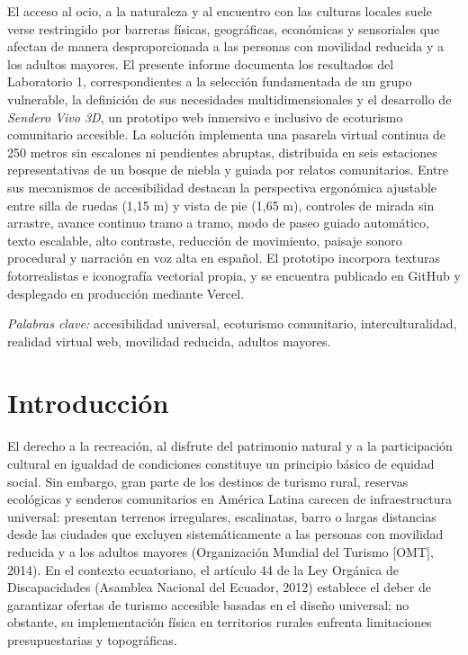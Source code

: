 \documentclass[12pt,letterpaper]{article}
\begin{document}
\noindent El acceso al ocio, a la naturaleza y al encuentro con las culturas locales suele verse restringido por barreras físicas, geográficas, económicas y sensoriales que afectan de manera desproporcionada a las personas con movilidad reducida y a los adultos mayores. El presente informe documenta los resultados del Laboratorio 1, correspondientes a la selección fundamentada de un grupo vulnerable, la definición de sus necesidades multidimensionales y el desarrollo de \textit{Sendero Vivo 3D}, un prototipo web inmersivo e inclusivo de ecoturismo comunitario accesible. La solución implementa una pasarela virtual continua de 250 metros sin escalones ni pendientes abruptas, distribuida en seis estaciones representativas de un bosque de niebla y guiada por relatos comunitarios. Entre sus mecanismos de accesibilidad destacan la perspectiva ergonómica ajustable entre silla de ruedas (1,15 m) y vista de pie (1,65 m), controles de mirada sin arrastre, avance continuo tramo a tramo, modo de paseo guiado automático, texto escalable, alto contraste, reducción de movimiento, paisaje sonoro procedural y narración en voz alta en español. El prototipo incorpora texturas fotorrealistas e iconografía vectorial propia, y se encuentra publicado en GitHub y desplegado en producción mediante Vercel.

\vspace{0.2cm}
\noindent\textit{Palabras clave:} accesibilidad universal, ecoturismo comunitario, interculturalidad, realidad virtual web, movilidad reducida, adultos mayores.

\newpage

\section{Introducción}

El derecho a la recreación, al disfrute del patrimonio natural y a la participación cultural en igualdad de condiciones constituye un principio básico de equidad social. Sin embargo, gran parte de los destinos de turismo rural, reservas ecológicas y senderos comunitarios en América Latina carecen de infraestructura universal: presentan terrenos irregulares, escalinatas, barro o largas distancias desde las ciudades que excluyen sistemáticamente a las personas con movilidad reducida y a los adultos mayores (Organización Mundial del Turismo [OMT], 2014). En el contexto ecuatoriano, el artículo 44 de la Ley Orgánica de Discapacidades (Asamblea Nacional del Ecuador, 2012) establece el deber de garantizar ofertas de turismo accesible basadas en el diseño universal; no obstante, su implementación física en territorios rurales enfrenta limitaciones presupuestarias y topográficas.
\end{document}

